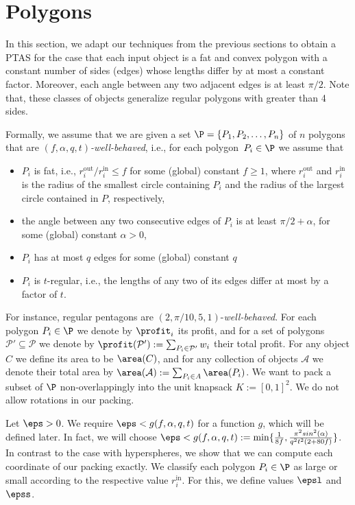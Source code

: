 \section{Polygons}
\label{sec:polygon}

{
In this section, we adapt our techniques from the previous sections to obtain a \textsf{PTAS} for the case that each input object is a fat and convex
polygon with a constant number of sides (edges) whose lengths differ by at most a constant factor. Moreover,  
each angle between any two adjacent edges is at least $\pi/2$. Note that, these classes of objects generalize regular polygons with greater than 4 sides. 
}

{Formally, we assume that we are given a set
$\P = \{ P_1, P_2, \dots , P_n \}$ of $n$ polygons that are \emph{$(f,\alpha,q, t)$-well-behaved}, i.e., for each
polygon~$P_{i}\in\P$ we assume that}
\begin{itemize}
	\item $P_i$ is fat, i.e., $r_{i}^{\mathrm{out}}/r_{i}^{\mathrm{in}}\le f$
	for some (global) constant $f \ge 1$, where
	$r_{i}^{\mathrm{out}}$ and $r_{i}^{\mathrm{in}}$ is
	the radius of the smallest circle containing $P_{i}$ and the radius
	of the largest circle contained in $P$, respectively,
	\item the angle between any two consecutive edges of $P_i$ is at least $\pi/2+\alpha$,
	for some (global) constant $\alpha>0$,
	\item $P_i$ has at most $q$ {edges} for some (global) constant $q$
 \item $P_i$ is $t$-regular, i.e., the lengths of any two of its edges
	differ at most by a factor of $t$.
\end{itemize}

For instance, regular pentagons are $(2,\pi/10,5,1)$-\emph{well-behaved}.
For each polygon \(P_i \in \P\) we denote by \(\profit_i\) its profit, and for a set of polygons
$\mathcal{P}' \subseteq \mathcal{P}$ we denote by $\profit(\mathcal{P}'):=\sum_{P_i \in \mathcal{P'}} w_i$ their total profit.
For any {object} $C$ we define its area to be $\area(C)$, and
for any collection of objects $\mathcal{A}$ we denote their {total} area by $\area(\mathcal{A}):=\sum_{P_i \in A} \area(P_i)$.
{We want to pack a subset of $\P$ non-overlappingly into the
unit knapsack $K := [0,1]^2$. We do not allow rotations in our packing.
}

Let $\eps>0$. We require $\eps < g(f,\alpha,q,t)$ for a function $g$, which will be defined later.
In fact, we will choose $\eps < g(f,\alpha,q,t) := \min \{\frac{1}{8f}, \frac{\pi^2 sin^2(\alpha)}{q^2t^2(2+80f)}\}$.
 In contrast to
the case with hyperspheres, we show that we can compute each coordinate of our
packing exactly. We classify each polygon $P_{i}\in\P$ as large or small according
to the respective value $r_{i}^{\mathrm{in}}$.
For this, we define values $\epsl$ and $\epss$. 


